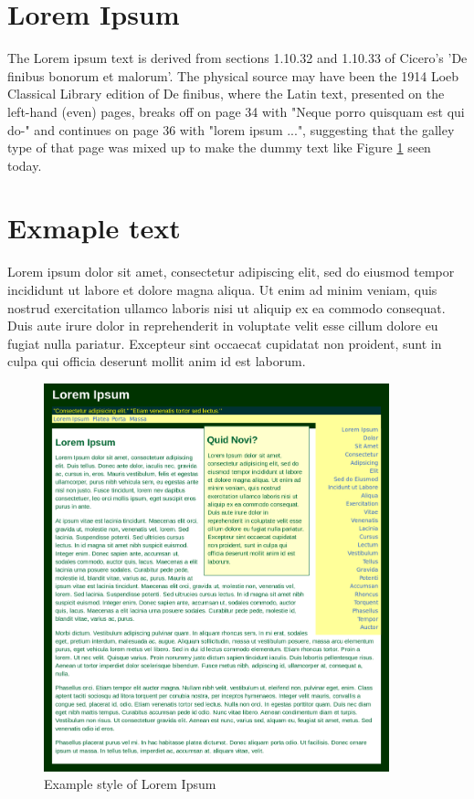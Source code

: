 \documentclass[a4paper]{article}
\begin{document}
\section{Lorem Ipsum}
The Lorem ipsum text is derived from sections 1.10.32 and 1.10.33 of Cicero's 'De finibus bonorum et malorum'. The physical source may have been the 1914 Loeb Classical Library edition of De finibus, where the Latin text, presented on the left-hand (even) pages, breaks off on page 34 with "Neque porro quisquam est qui do-" and continues on page 36 with "lorem ipsum ...", suggesting that the galley type of that page was mixed up to make the dummy text like Figure \ref{fig:Lorem Ipsum} seen today.
\section{Exmaple text}
Lorem ipsum dolor sit amet, consectetur adipiscing elit, sed do eiusmod tempor incididunt ut labore et dolore magna aliqua. Ut enim ad minim veniam, quis nostrud exercitation ullamco laboris nisi ut aliquip ex ea commodo consequat. Duis aute irure dolor in reprehenderit in voluptate velit esse cillum dolore eu fugiat nulla pariatur. Excepteur sint occaecat cupidatat non proident, sunt in culpa qui officia deserunt mollit anim id est laborum.

\begin{figure}
    \centering
    \includegraphics[width=10cm]{lorem ipsum.jpg}
    \caption{Example style of Lorem Ipsum}
    \label{fig:Lorem Ipsum}
\end{figure}
\end{document}
